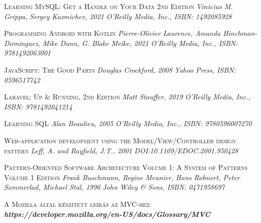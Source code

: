 \documentclass[
]{thesis-ekf}
\theoremstyle{definition}
\theoremstyle{remark}
\begin{document}
\begin{thebibliography}{2}
\textsc{Learning MySQL: Get a Handle on Your Data 2nd Edition}
\newline
\emph{Vinicius M. Grippa, Sergey Kuzmichev,  2021}
\emph{O'Reilly Media, Inc., ISBN: 1492085928}

\textsc{Programming Android with Kotlin}
\newline
\emph{Pierre-Olivier Laurence, Amanda Hinchman-Dominguez, Mike Dunn, G. Blake Meike,  2021}
\emph{O'Reilly Media, Inc., ISBN: 9781492063001}

\textsc{JavaScript: The Good Parts}
\newline
\emph{Douglas Crockford, 2008}
\emph{Yahoo Press, ISBN: 0596517742}

\textsc{Laravel: Up \& Running, 2nd Edition}
\newline
\emph{Matt Stauffer, 2019}
\emph{O'Reilly Media, Inc., ISBN: 9781492041214}

\textsc{Learning SQL}
\newline
\emph{Alan Beaulieu, 2005}
\emph{O'Reilly Media, Inc., ISBN: 9780596007270}

\textsc{Web-application development using the Model/View/Controller design pattern}
\newline
\emph{Leff, A. and Rayfield, J.T., 2001}
\emph{DOI:10.1109/EDOC.2001.950428}

\textsc{Pattern-Oriented Software Architecture Volume 1: A System of Patterns Volume 1 Edition}
\newline
\emph{Frank Buschmann, Regine Meunier, Hans Rohnert, Peter Sommerlad, Michael Stal, 1996}
\emph{John Wiley \& Sons, ISBN: 0471958697}

\textsc{A Mozilla által készített leírás az MVC-hez:}
\newline
\emph{\bf{https://developer.mozilla.org/en-US/docs/Glossary/MVC}}

\end{thebibliography}

%
\end{document}
